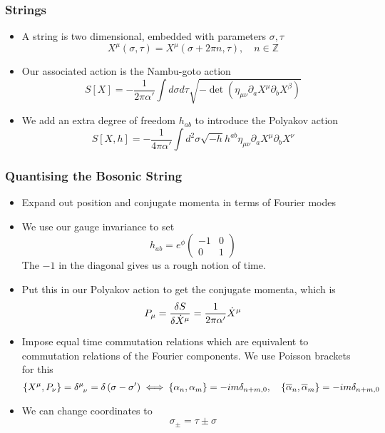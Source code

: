 \documentclass[11pt, oneside]{article}   	%
\theoremstyle{slanted}
\begin{document}
\subsubsection*{Strings}
\begin{itemize}
	\item A string is two dimensional, 
		embedded with parameters $ \sigma, \tau $
		\[
			X^ \mu  \left( \sigma, \tau  \right)   = X^ \mu 
			\left(  \sigma + 2 \pi n , \tau  \right) , \quad 
			n \in \mathbb{ Z } 
		\]
	\item Our associated action is the Nambu-goto action 
	\[
		S[X] =  - \frac{1}{ 2 \pi \alpha ' }\int d \sigma d \tau 
		\sqrt{  - \det\left( \eta_{ \mu \nu } 
		\partial  _ a X ^ \mu \partial  _ b X ^ \beta \right) } 
	\] 
\item We add an extra degree of freedom $ h _{ ab } $ to introduce 
	the Polyakov action 
	\[
	 S[X, h ] = - \frac{1}{4 \pi \alpha ' } 
	 \int d ^ 2 \sigma \sqrt{  - h }  h ^{ ab } \eta _{ \mu \nu } 
	 \partial  _ a X ^ \mu \partial  _ b X ^ \nu 
	\]  
\end{itemize}


\subsubsection*{Quantising the Bosonic String}

\begin{itemize}
	\item Expand out position and conjugate 
		momenta in terms of Fourier modes
	\item We use our gauge invariance to 
		set 
		\[
			h_{ ab }  = e ^{ \phi } \begin{pmatrix}  - 1 &  0 
			\\ 0 & 1 \end{pmatrix} 
		\] The $ - 1 $ in the diagonal gives us a rough notion 
		of time. 
	\item Put this in our Polyakov action to get the 
		conjugate momenta, which is 
		\[
			P_\mu  = \fdv{S}{\dot{ X } ^ \mu  }
			 = \frac{1}{2 \pi \alpha '  } \dot{ X } ^ \mu  
		\]  
	\item Impose equal time commutation relations 
		which are equivalent to commutation 
		relations of the Fourier components. We use Poisson 
		brackets for this
		\[
		 \left\{ X ^ \mu, P_ \nu  \right\}  = 
		 \delta \indices{ ^ \mu _ \nu }  = \delta \left( \sigma  - \sigma '  \right) \iff \left\{ \alpha_ n , \alpha_ m  \right\}   = 
	 - i m \delta_{ n + m , 0 } , \quad \left\{  \overline{ \alpha }_ n, 
 \overline{ \alpha } _ m  \right\}   = - i m \delta _{ n + m , 0  } \]
	
	\item We can change coordinates to 
		\[
		 \sigma_{ \pm }  = \tau \pm \sigma 
		\] 
\end{itemize}
\end{document}
